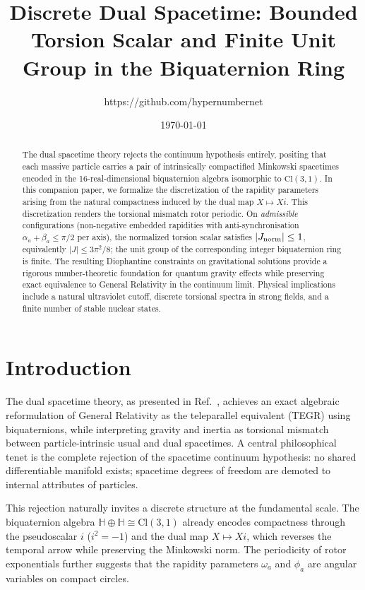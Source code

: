 \documentclass[dvipdfmx,11pt,a4paper]{article}
\title{Discrete Dual Spacetime: Bounded Torsion Scalar and Finite Unit Group in the Biquaternion Ring}
\author{https://github.com/hypernumbernet}
\date{\today}
\newcommand{\Jnorm}{J_{\rm norm}}
\begin{document}
\maketitle

\begin{abstract}
The dual spacetime theory rejects the continuum hypothesis entirely, positing that each massive particle carries a pair of intrinsically compactified Minkowski spacetimes encoded in the 16-real-dimensional biquaternion algebra isomorphic to $\mathrm{Cl}(3,1)$. In this companion paper, we formalize the discretization of the rapidity parameters arising from the natural compactness induced by the dual map $X \mapsto Xi$. This discretization renders the torsional mismatch rotor periodic. On \emph{admissible} configurations (non-negative embedded rapidities with anti-synchronisation $\alpha_a+\beta_a\leq\pi/2$ per axis), the normalized torsion scalar satisfies $|\Jnorm|\leq 1$, equivalently $|J|\leq 3\pi^2/8$; the unit group of the corresponding integer biquaternion ring is finite. The resulting Diophantine constraints on gravitational solutions provide a rigorous number-theoretic foundation for quantum gravity effects while preserving exact equivalence to General Relativity in the continuum limit. Physical implications include a natural ultraviolet cutoff, discrete torsional spectra in strong fields, and a finite number of stable nuclear states.
\end{abstract}

\section{Introduction}
\label{sec:intro}

The dual spacetime theory, as presented in Ref.~\cite{main-paper}, achieves an exact algebraic reformulation of General Relativity as the teleparallel equivalent (TEGR) using biquaternions, while interpreting gravity and inertia as torsional mismatch between particle-intrinsic usual and dual spacetimes. A central philosophical tenet is the complete rejection of the spacetime continuum hypothesis: no shared differentiable manifold exists; spacetime degrees of freedom are demoted to internal attributes of particles.

This rejection naturally invites a discrete structure at the fundamental scale. The biquaternion algebra $\mathbb{H} \oplus \mathbb{H} \cong \mathrm{Cl}(3,1)$ already encodes compactness through the pseudoscalar $i$ ($i^2 = -1$) and the dual map $X \mapsto Xi$, which reverses the temporal arrow while preserving the Minkowski norm. The periodicity of rotor exponentials further suggests that the rapidity parameters $\omega_a$ and $\phi_a$ are angular variables on compact circles.
\end{document}
